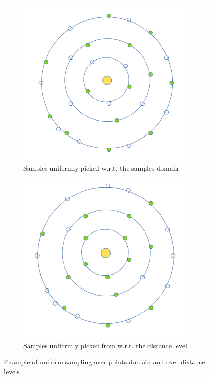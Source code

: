 \begin{figure}[H]
	\begin{center}
		\begin{subfigure}[b]{0.48\textwidth}
			\includegraphics[width=\textwidth]{figures/SampleDistrUnifOverDomain.png}
			\caption{Samples uniformly picked w.r.t. the samples domain}
		\end{subfigure}
		\begin{subfigure}[b]{0.48\textwidth}
			\includegraphics[width=\textwidth]{figures/SampleDistrOverLeveDist.png}
			\caption{Samples uniformly picked from w.r.t. the distance level}
		\end{subfigure}

	\end{center}
	\caption{Example of uniform sampling over points domain and over distance levels}
	\label{fig:samples_distribution}
\end{figure}

